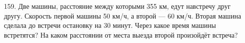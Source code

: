 159. Две машины, расстояние между которыми 355 км, едут навстречу друг другу. Скорость первой машины 50 км/ч, а второй --- 60 км/ч. Вторая машина сделала до встречи остановку на 30 минут. Через какое время машины встретятся? На каком расстоянии от места выезда второй произойдёт встреча?\\
